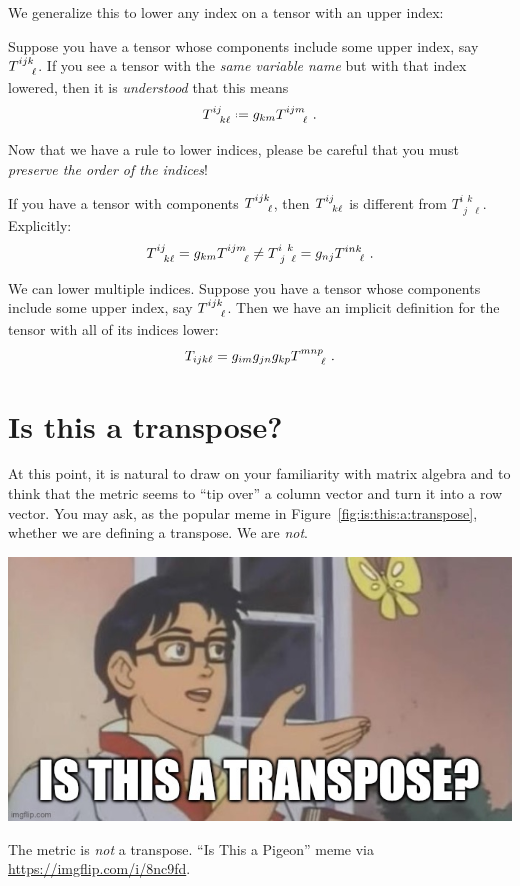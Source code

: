 \documentclass[12pt, oneside]{report}    %
\let\oldsection\section
\def\section{%
  \setcounter{sidenote}{1}%
  \oldsection
}
\begin{document}
We generalize this to lower any index on a tensor with an upper index:
\begin{newrule}
Suppose you have a tensor whose components include some upper index, say $T\aij{ijk}{\ell}$. If you see a tensor with the \emph{same variable name} but with that index lowered, then it is \emph{understood} that this means
\begin{align}
    T\aij{ij}{k\ell} \defeq g_{km}T\aij{ijm}{\ell} \ .
\end{align}
\end{newrule}
Now that we have a rule to lower indices, please be careful that you must \emph{preserve the order of the indices}! 
\begin{example}
If you have a tensor with components $T\aij{ijk}{\ell}$, then $T\aij{ij}{k\ell}$ is different from $T^{i\phantom{j}k}_{\phantom{i}j\phantom{k}\ell}$. Explicitly:
\begin{align}
    T\aij{ij}{k\ell} = g_{km}T\aij{ijm}{\ell}
    \neq
    T^{i\phantom{j}k}_{\phantom{i}j\phantom{k}\ell}
    = g_{nj}T\aij{ink}{\ell} \ .
\end{align}
\end{example}
\begin{example}
We can lower multiple indices. Suppose you have a tensor whose components include some upper index, say $T\aij{ijk}{\ell}$. Then we have an implicit definition for the tensor with all of its indices lower:
\begin{align}
    T_{ijk\ell} = g_{im}g_{jn}g_{kp}T\aij{mnp}{\ell} \ .
\end{align}
\end{example}

\section{Is this a transpose?}

At this point, it is natural to draw on your familiarity with matrix algebra and to think that the metric seems to ``tip over'' a column vector and turn it into a row vector. You may ask, as the popular meme in Figure~\ref{fig:is:this:a:transpose}, whether we are defining a transpose. We are \emph{not}.
\begin{marginfigure}%
    \includegraphics[width=\textwidth]{figures/IsThisTranspose.jpg}
    \caption{The metric is \emph{not} a transpose. ``Is This a Pigeon'' meme via \url{https://imgflip.com/i/8nc9fd}.}
    \label{fig:is:this:a:transpose}
\end{marginfigure}
\end{document}
